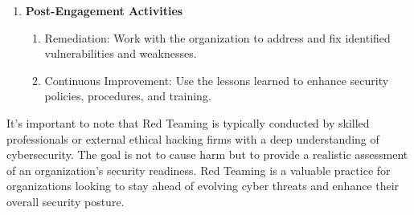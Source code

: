 \begin{enumerate}
\item \textbf{Post-Engagement Activities}
\begin{enumerate}
\item Remediation: Work with the organization to address and fix identified vulnerabilities and weaknesses.
\item Continuous Improvement: Use the lessons learned to enhance security policies, procedures, and training.
\end{enumerate}

\end{enumerate}

It's important to note that Red Teaming is typically conducted by skilled professionals or external ethical hacking firms with a deep understanding of cybersecurity. The goal is not to cause harm but to provide a realistic assessment of an organization's security readiness. Red Teaming is a valuable practice for organizations looking to stay ahead of evolving cyber threats and enhance their overall security posture.
